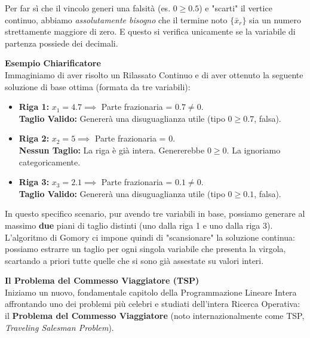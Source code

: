 \documentclass[12pt, a4paper]{article}
\begin{document}
	Per far sì che il vincolo generi una falsità (es. $0 \geq 0.5$) e "scarti" il vertice continuo, abbiamo \textit{assolutamente bisogno} che il termine noto $\{\bar{x}_r\}$ sia un numero strettamente maggiore di zero. E questo si verifica unicamente se la variabile di partenza possiede dei decimali.
	
	\vspace{0.4cm}
	\textbf{Esempio Chiarificatore}\\
	Immaginiamo di aver risolto un Rilassato Continuo e di aver ottenuto la seguente soluzione di base ottima (formata da tre variabili):
	\begin{itemize}[label=\textcolor{titlecolor}{\Large\textbullet}, itemsep=2pt, leftmargin=1.5cm]
		\item \textbf{Riga 1:} $x_1 = 4.7 \implies$ Parte frazionaria = $0.7 \neq 0$. \\
		\textbf{Taglio Valido:} Genererà una disuguaglianza utile (tipo $0 \geq 0.7$, falsa).
		
		\item \textbf{Riga 2:} $x_2 = 5 \implies$ Parte frazionaria = $0$. \\
		\textbf{Nessun Taglio:} La riga è già intera. Genererebbe $0 \geq 0$. La ignoriamo categoricamente.
		
		\item \textbf{Riga 3:} $x_3 = 2.1 \implies$ Parte frazionaria = $0.1 \neq 0$. \\
		\textbf{Taglio Valido:} Genererà una disuguaglianza utile (tipo $0 \geq 0.1$, falsa).
	\end{itemize}
	
	In questo specifico scenario, pur avendo tre variabili in base, possiamo generare al massimo \textbf{due} piani di taglio distinti (uno dalla riga 1 e uno dalla riga 3). 
	L'algoritmo di Gomory ci impone quindi di "scansionare" la soluzione continua: possiamo estrarre un taglio per ogni singola variabile che presenta la virgola, scartando a priori tutte quelle che si sono già assestate su valori interi.
	
	\vspace{0.6cm}
	\textbf{Il Problema del Commesso Viaggiatore (TSP)}\\
	Iniziamo un nuovo, fondamentale capitolo della Programmazione Lineare Intera affrontando uno dei problemi più celebri e studiati dell'intera Ricerca Operativa: il \textbf{Problema del Commesso Viaggiatore} (noto internazionalmente come TSP, \textit{Traveling Salesman Problem}).
	
\end{document}
